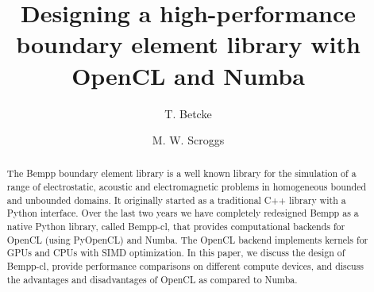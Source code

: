 \documentclass{IEEEcsmag}
\begin{document}

\title{Designing a high-performance boundary element library with OpenCL and Numba}

\author{T. Betcke}

\author{M. W. Scroggs}


\begin{abstract}
The Bempp boundary element library is a well known library for the simulation of a range of electrostatic, acoustic and electromagnetic problems in homogeneous bounded and unbounded domains. It originally started as a traditional C++ library with a Python interface. Over the last two years we have completely redesigned Bempp as a native Python library, called Bempp-cl, that provides computational backends for OpenCL (using PyOpenCL) and Numba. The OpenCL backend implements kernels for GPUs and CPUs with SIMD optimization. In this paper, we discuss the design of Bempp-cl, provide performance comparisons on different compute devices, and discuss the advantages and disadvantages of OpenCL as compared to Numba.
\end{abstract}

\maketitle







\end{document}
